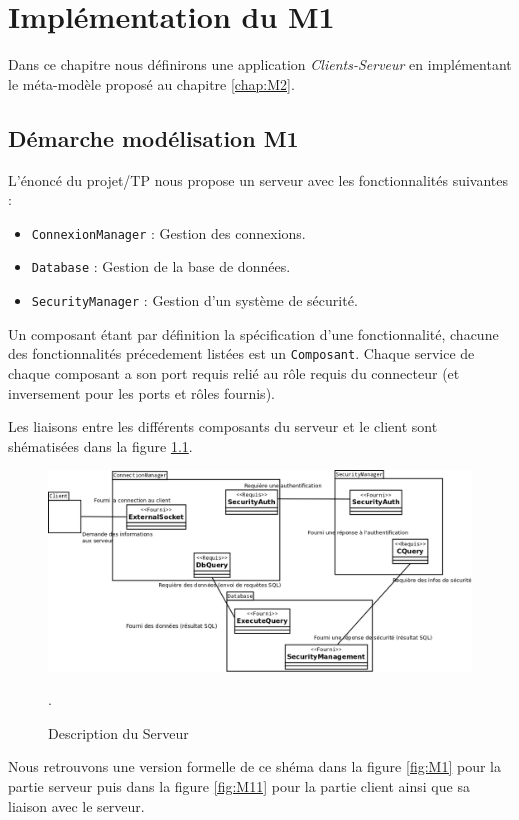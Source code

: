 \chapter{Implémentation du M1}\label{chap:M1}
Dans ce chapitre nous définirons une application \textit{Clients-Serveur} en implémentant le méta-modèle proposé au chapitre \ref{chap:M2}.

\section{Démarche modélisation M1}
L'énoncé du projet/TP nous propose un serveur avec les fonctionnalités suivantes :

\begin{itemize}
\item \verb+ConnexionManager+ : Gestion des connexions. 
\item  \verb+Database+ : Gestion de la base de données.
\item \verb+SecurityManager+ :  Gestion d'un système de sécurité.
\end{itemize}

Un composant étant par définition la spécification d'une fonctionnalité, chacune des fonctionnalités précedement listées est un \verb+Composant+. Chaque service de chaque composant a son port requis relié au rôle requis  du connecteur (et inversement pour les ports et rôles fournis).

Les liaisons entre les différents composants du serveur et le client sont shématisées dans la figure \ref{fig:desSer}. 
\begin{figure}[htb]
  \centering
  \includegraphics[scale=0.32]{img/DescribServeur}
  \caption{Description du Serveur}
  \label{fig:desSer}.
\end{figure}

Nous retrouvons une version formelle de ce shéma dans la figure \ref{fig:M1} pour la partie \og serveur \fg{} puis dans la figure \ref{fig:M11} pour la partie \og client \fg{} ainsi que sa liaison avec le serveur.


